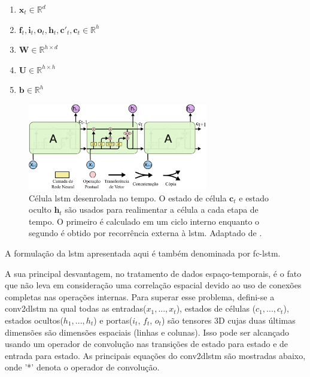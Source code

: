 \begin{enumerate}
	\item $\textbf{x}_t \in \mathbb{R}^{d}$
	\item $\textbf{f}_t,\textbf{i}_t,\textbf{o}_t,\textbf{h}_t,\textbf{c}'_t,\textbf{c}_t \in \mathbb{R}^{h}$ 
	\item $\textbf{W} \in \mathbb{R}^{h \times d} $
	\item $\textbf{U} \in \mathbb{R}^{h \times h}$
	\item $\textbf{b} \in \mathbb{R}^{h}$
\end{enumerate}

\begin{figure}[h]
	\centering
	\includegraphics[width=0.7\textwidth]{figuras/lstm_no_tempo.pdf}
	\caption[Célula \acrshort{lstm} no tempo]{Célula \acrshort{lstm} desenrolada no tempo. O estado de célula $\textbf{c}_{t}$ e estado oculto $\textbf{h}_{t}$ são usados para realimentar a célula a cada etapa de tempo. O primeiro é calculado em um ciclo interno enquanto o segundo é obtido por recorrência externa à \acrshort{lstm}. Adaptado de \cite{Olah}.}
	\label{fig:lstm_time}
\end{figure}

A formulação da \acrshort{lstm} apresentada aqui é também denominada por \gls{fc-lstm}.

A sua principal desvantagem, no tratamento de dados espaço-temporais, é o fato que não leva em consideração uma correlação espacial devido ao uso de conexões completas nas operações internas.  
Para superar esse problema, defini-se a \gls{conv2dlstm} \cite{xingjian2015convolutional,FullResolution2017Toderici} na qual todas as entradas($x_1,..., x_t$), estados de células ($c_1,..., c_t$), estados ocultos($h_1,..., h_t$) e portas($i_t$, $f_t$, $o_t$) são tensores 3D cujas duas últimas dimensões são dimensões espaciais (linhas e colunas). Isso pode ser alcançado usando um operador de convolução nas transições de estado para estado e de entrada para estado. As principais equações do \acrshort{conv2dlstm} são mostradas abaixo, onde '*' denota o operador de convolução.

